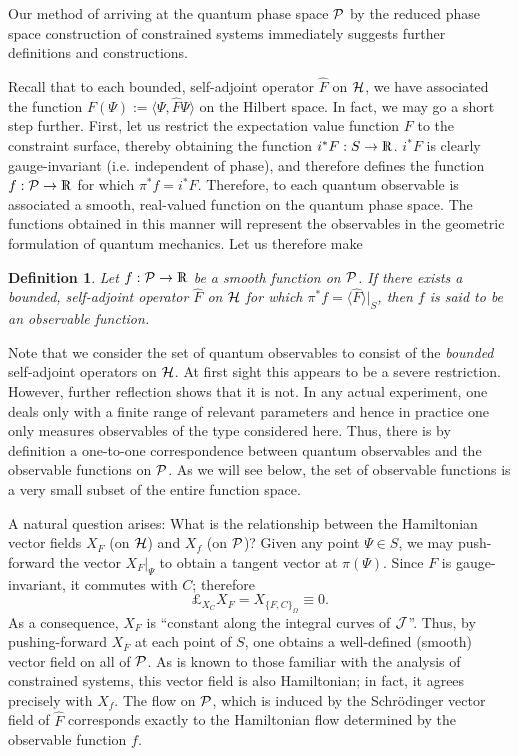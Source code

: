 \documentclass[12pt,aps,eqsecnum,tighten]{revtex4-2}
\newtheorem{definition}{Definition}[section]
\def\<{\langle}
\def\>{\rangle}
\def\H{{\cal H}}
\def\P{{\cal P}}
\def\W{\Omega}
\def\J{{\cal J}}
\newcommand{\lie}[1]{{\pounds}_{#1}}
\newcommand{\hvf}[1]{{X_{#1}}}
\def\Rl{{\mathchoice 
{\setbox0=\hbox{$\displaystyle\rm R$}\hbox{\hbox to0pt
{\kern0.4\wd0\vrule height0.9\ht0\hss}\box0}}
{\setbox0=\hbox{$\textstyle\rm R$}\hbox{\hbox to0pt
{\kern0.4\wd0\vrule height0.9\ht0\hss}\box0}}
{\setbox0=\hbox{$\scriptstyle\rm R$}\hbox{\hbox to0pt
{\kern0.4\wd0\vrule height0.9\ht0\hss}\box0}}
{\setbox0=\hbox{$\scriptscriptstyle\rm R$}\hbox{\hbox to0pt
{\kern0.4\wd0\vrule height0.9\ht0\hss}\box0}}}}
\def\Rl{{\mathchoice
{\setbox0=\hbox{$\displaystyle\rm R$}\hbox{\hbox to0pt
{\kern0.4\wd0\vrule height0.9\ht0\hss}\box0}}
{\setbox0=\hbox{$\textstyle\rm R$}\hbox{\hbox to0pt
{\kern0.4\wd0\vrule height0.9\ht0\hss}\box0}}
{\setbox0=\hbox{$\scriptstyle\rm R$}\hbox{\hbox to0pt
{\kern0.4\wd0\vrule height0.9\ht0\hss}\box0}}
{\setbox0=\hbox{$\scriptscriptstyle\rm R$}\hbox{\hbox to0pt
{\kern0.4\wd0\vrule height0.9\ht0\hss}\box0}}}}
\def\R{\Rl}
\begin{document}
Our method of arriving at the quantum phase space $\P$ by the reduced
phase space construction of constrained systems immediately suggests
further definitions and constructions.

Recall that to each bounded, self-adjoint operator $\hat{F}$ on $\H$,
we have associated the function $F(\Psi) := \< \Psi, \hat{F} \Psi \>$
on the Hilbert space.  In fact, we may go a short step further.
First, let us restrict the expectation value function $F$ to the
constraint surface, thereby obtaining the function $i^*F : S
\rightarrow \R$.  $i^*F$ is clearly gauge-invariant (i.e. independent
of phase), and therefore defines the function $f: \P \rightarrow \R$
for which $\pi^*f = i^*F$.  Therefore, to each quantum observable is
associated a smooth, real-valued function on the quantum phase space.
The functions obtained in this manner will represent the observables
in the geometric formulation of quantum mechanics. Let us therefore
make
%
\begin{definition} \label{defn_observable_fn}
Let $f: \P \rightarrow \R$ be a smooth function on $\P$.  If there
exists a bounded, self-adjoint operator $\hat{F}$ on $\H$ for which
$\pi^*f = \< \hat{F} \>\big|_S$, then $f$ is said to be an {\em
observable function}.
\end{definition}
\noindent
Note that we consider the set of quantum observables to consist of the
{\em bounded} self-adjoint operators on $\H$. At first sight this
appears to be a severe restriction. However, further reflection shows
that it is not. In any actual experiment, one deals only with a finite
range of relevant parameters and hence in practice one only measures
observables of the type considered here.  Thus, there is by definition
a one-to-one correspondence between quantum observables and the
observable functions on $\P$.  As we will see below, the set of
observable functions is a very small subset of the entire function
space.

A natural question arises: What is the relationship between the
Hamiltonian vector fields $\hvf{F}$ (on $\H$) and $\hvf{f}$ (on $\P$)?
Given any point $\Psi \in S$, we may push-forward the vector
$\hvf{F}\big|_\Psi$ to obtain a tangent vector at $\pi(\Psi)$.  Since
$F$ is gauge-invariant, it commutes with $C$; therefore
%
\[	\lie{\hvf{C}} \hvf{F} = \hvf{ \{ F, C\}_\W} \equiv 0.	\]
%
As a consequence, $\hvf{F}$ is ``constant along the integral curves of
$\J$''.  Thus, by pushing-forward $\hvf{F}$ at each point of $S$, one
obtains a well-defined (smooth) vector field on all of $\P$.  As is
known to those familiar with the analysis of constrained systems, this
vector field is also Hamiltonian; in fact, it agrees precisely with
$\hvf{f}$.  The flow on $\P$, which is induced by the Schr\"odinger
vector field of $\hat{F}$ corresponds exactly to the Hamiltonian flow
determined by the observable function $f$.
\end{document}
